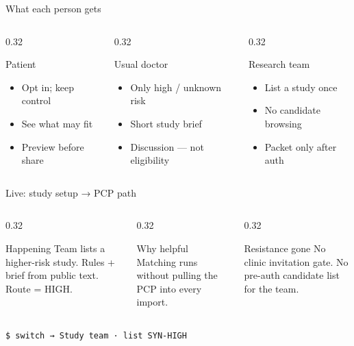 \documentclass[aspectratio=169,10pt]{beamer}
\begin{document}
\begin{frame}{What each person gets}
\begin{columns}[T]
\begin{column}{0.32\textwidth}
\begin{tbox}{Patient}
\small
\begin{itemize}
\item Opt in; keep control
\item See what may fit
\item Preview before share
\end{itemize}
\end{tbox}
\end{column}
\begin{column}{0.32\textwidth}
\begin{tbox}{Usual doctor}
\small
\begin{itemize}
\item Only high / unknown risk
\item Short study brief
\item Discussion --- not eligibility
\end{itemize}
\end{tbox}
\end{column}
\begin{column}{0.32\textwidth}
\begin{tbox}{Research team}
\small
\begin{itemize}
\item List a study once
\item No candidate browsing
\item Packet only after auth
\end{itemize}
\end{tbox}
\end{column}
\end{columns}
\end{frame}

\begin{frame}{Live: study setup → PCP path}
\begin{columns}[T]
\begin{column}{0.32\textwidth}
\begin{tbox}{Happening}
\small
Team lists a higher-risk study. Rules + brief from public text. Route = \alert{HIGH}.
\end{tbox}
\end{column}
\begin{column}{0.32\textwidth}
\begin{tbox}{Why helpful}
\small
Matching runs without pulling the PCP into every import.
\end{tbox}
\end{column}
\begin{column}{0.32\textwidth}
\begin{tbox}{Resistance gone}
\small
No clinic invitation gate. No pre-auth candidate list for the team.
\end{tbox}
\end{column}
\end{columns}
\vskip12pt
\centering\small\texttt{\$ switch → Study team · list SYN-HIGH}\,\terminalcursor
\end{frame}
\end{document}
